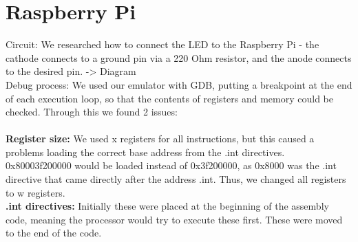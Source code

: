 \documentclass[11pt]{article}
\begin{document}
\section{Raspberry Pi}
Circuit: We researched how to connect the LED to the Raspberry Pi - the cathode connects to a ground pin via a 220 Ohm resistor, and the anode connects to the desired pin. -> Diagram\\
Debug process: We used our emulator with GDB, putting a breakpoint at the end of each execution loop, so that the contents of registers and memory could be checked. Through this we found 2 issues:\\
\\\textbf{Register size:} We used x registers for all instructions, but this caused a problems loading the correct base address from the .int directives. 0x80003f200000 would be loaded instead of 0x3f200000, as 0x8000 was the .int  directive that came directly after the address .int. Thus, we changed all registers to w registers.\\
\textbf{.int directives:} Initially these were placed at the beginning of the assembly code, meaning the processor would try to execute these first. These were moved to the end of the code.
\end{document}
